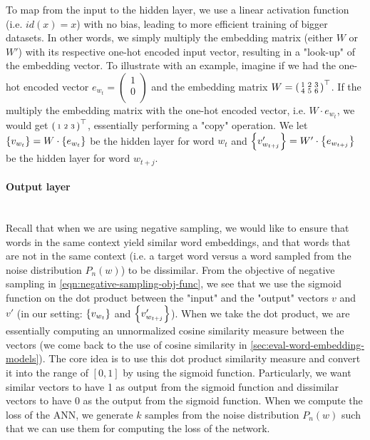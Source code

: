 To map from the input to the hidden layer, we use a linear activation function (i.e. $id(x) = x$) with no bias, leading to more efficient training of bigger datasets. In other words, we simply multiply the embedding matrix (either $W$ or $W'$) with its respective one-hot encoded input vector, resulting in a "look-up" of the embedding vector. To illustrate with an example, imagine if we had the one-hot encoded vector $e_{w_t} = \left( \begin{smallmatrix}
    1\\
    0\\
\end{smallmatrix} \right)$ and the embedding matrix $W = {\left( \begin{smallmatrix}
    1 & 2 & 3\\
    4 & 5 & 6\\
\end{smallmatrix} \right)}^\top$. If the multiply the embedding matrix with the one-hot encoded vector, i.e. $W \cdot e_{w_t}$, we would get ${\left( \begin{smallmatrix}
    1 & 2 & 3\\
\end{smallmatrix} \right)}^\top$, essentially performing a "copy" operation. We let $\left\{v_{w_t}\right\} = W \cdot \left\{e_{w_t}\right\}$ be the hidden layer for word $w_t$ and $\left\{v'_{w_{t+j}}\right\} = W' \cdot \left\{e_{w_{t+j}}\right\}$ be the hidden layer for word $w_{t+j}$. 

\paragraph*{Output layer}\mbox{} \\
Recall that when we are using negative sampling, we would like to ensure that words in the same context yield similar word embeddings, and that words that are not in the same context (i.e. a target word versus a word sampled from the noise distribution $P_n(w)$) to be dissimilar. From the objective of negative sampling in \cref{eqn:negative-sampling-obj-func}, we see that we use the sigmoid function on the dot product between the "input" and the "output" vectors $v$ and $v'$ (in our setting: $\left\{v_{w_t}\right\}$ and $\left\{v'_{w_{t+j}}\right\}$). When we take the dot product, we are essentially computing an unnormalized cosine similarity measure between the vectors (we come back to the use of cosine similarity in \cref{sec:eval-word-embedding-models}). The core idea is to use this dot product similarity measure and convert it into the range of $[0, 1]$ by using the sigmoid function. Particularly, we want similar vectors to have 1 as output from the sigmoid function and dissimilar vectors to have 0 as the output from the sigmoid function. When we compute the loss of the ANN, we generate $k$ samples from the noise distribution $P_n(w)$ such that we can use them for computing the loss of the network.

